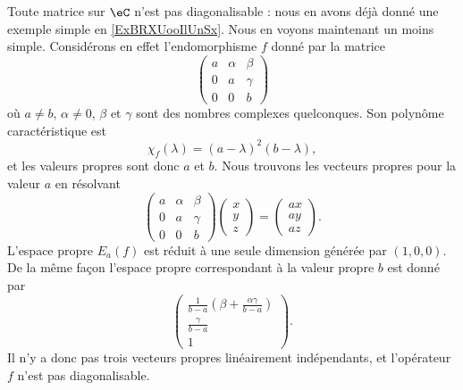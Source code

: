 \begin{remark}  \label{RemBOGooCLMwyb}
    Toute matrice sur \( \eC\) n'est pas diagonalisable : nous en avons déjà donné une exemple simple en \ref{ExBRXUooIlUnSx}. Nous en voyons maintenant un moins simple. Considérons en effet l'endomorphisme \( f\) donné par la matrice
    \begin{equation}
        \begin{pmatrix}
            a&    \alpha    &   \beta    \\
            0    &   a    &   \gamma    \\
            0    &   0    &   b
        \end{pmatrix}
    \end{equation}
    où \( a\neq b\), \( \alpha\neq 0\), \( \beta\) et \( \gamma\) sont des nombres complexes quelconques.
    Son polynôme caractéristique est 
    \begin{equation}
        \chi_f(\lambda)=(a-\lambda)^2(b-\lambda),
    \end{equation}
    et les valeurs propres sont donc \( a\) et \( b\). Nous trouvons les vecteurs propres pour la valeur \( a\) en résolvant
    \begin{equation}
        \begin{pmatrix}
            a    &   \alpha    &   \beta    \\
            0    &   a    &   \gamma    \\
            0    &   0    &   b
        \end{pmatrix}\begin{pmatrix}
            x    \\ 
            y    \\ 
            z    
        \end{pmatrix}=\begin{pmatrix}
            ax    \\ 
            ay    \\ 
            az    
        \end{pmatrix}.
    \end{equation}
    L'espace propre \( E_a(f)\) est réduit à une seule dimension générée par \( (1,0,0)\). De la même façon l'espace propre correspondant à la valeur propre \( b\) est donné par 
    \begin{equation}
        \begin{pmatrix}
            \frac{1}{ b-a }\left( \beta+\frac{ \alpha\gamma }{ b-a } \right)    \\ 
            \frac{ \gamma }{ b-a }    \\ 
            1    
        \end{pmatrix}.
    \end{equation}
    Il n'y a donc pas trois vecteurs propres linéairement indépendants, et l'opérateur \( f\) n'est pas diagonalisable.


\end{remark}
